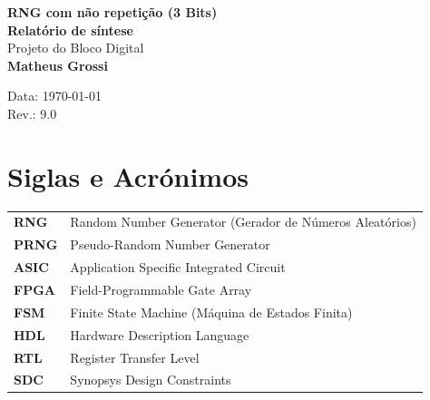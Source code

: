 \documentclass[12pt, a4paper]{article}
\begin{document}
	
	\begin{titlepage}
		\centering
		\vspace*{2cm}
		
		{\LARGE \textbf{RNG com não repetição (3 Bits)}}\\[0.5cm]
		{\Huge \textbf{Relatório de síntese}}\\[1.5cm]
		
		{\Large Projeto do Bloco Digital}\\[2cm]
		
		{\Large \textbf{Matheus Grossi}}\\[0.2cm]
		
		\vfill
		
		Data: \today\\
		Rev.: 9.0
		
		\vspace*{1cm}
	\end{titlepage}
	
	\tableofcontents
	\vspace*{1cm}
	
	\section*{Siglas e Acrónimos}
	
	\begin{tabular}{ll}
		\textbf{RNG}  & Random Number Generator (Gerador de Números Aleatórios) \\
		\textbf{PRNG} & Pseudo-Random Number Generator \\
		\textbf{ASIC} & Application Specific Integrated Circuit \\
		\textbf{FPGA} & Field-Programmable Gate Array \\
		\textbf{FSM}  & Finite State Machine (Máquina de Estados Finita) \\
		\textbf{HDL}  & Hardware Description Language \\
		\textbf{RTL}  & Register Transfer Level \\
		\textbf{SDC}  & Synopsys Design Constraints \\
	\end{tabular}
	
\end{document}
